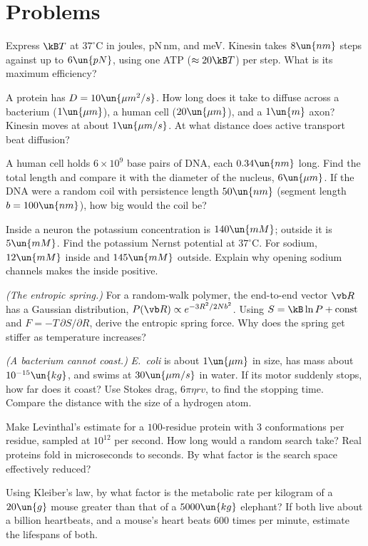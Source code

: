 \section{Problems}

\begin{problems}
\core Express $\kB T$ at $37^\circ\text{C}$ in joules, pN\,nm, and meV. Kinesin takes $8\un{nm}$ steps against up to $6\un{pN}$, using one ATP ($\approx20\kB T$) per step. What is its maximum efficiency?

\core A protein has $D = 10\un{\mu m^2/s}$. How long does it take to diffuse across a bacterium ($1\un{\mu m}$), a human cell ($20\un{\mu m}$), and a $1\un{m}$ axon? Kinesin moves at about $1\un{\mu m/s}$. At what distance does active transport beat diffusion?

 A human cell holds $6\times10^9$ base pairs of DNA, each $0.34\un{nm}$ long. Find the total length and compare it with the diameter of the nucleus, $6\un{\mu m}$. If the DNA were a random coil with persistence length $50\un{nm}$ (segment length $b = 100\un{nm}$), how big would the coil be?

\core Inside a neuron the potassium concentration is $140\un{mM}$; outside it is $5\un{mM}$. Find the potassium Nernst potential at $37^\circ\text{C}$. For sodium, $12\un{mM}$ inside and $145\un{mM}$ outside. Explain why opening sodium channels makes the inside positive.

\core \emph{(The entropic spring.)} For a random-walk polymer, the end-to-end vector $\vb R$ has a Gaussian distribution, $P(\vb R)\propto e^{-3R^2/2Nb^2}$. Using $S = \kB\ln P + \text{const}$ and $F = -T\,\partial S/\partial R$, derive the entropic spring force. Why does the spring get stiffer as temperature increases?

 \emph{(A bacterium cannot coast.)} \emph{E.~coli} is about $1\un{\mu m}$ in size, has mass about $10^{-15}\un{kg}$, and swims at $30\un{\mu m/s}$ in water. If its motor suddenly stops, how far does it coast? Use Stokes drag, $6\pi\eta rv$, to find the stopping time. Compare the distance with the size of a hydrogen atom.

 Make Levinthal's estimate for a $100$-residue protein with $3$ conformations per residue, sampled at $10^{12}$ per second. How long would a random search take? Real proteins fold in microseconds to seconds. By what factor is the search space effectively reduced?

 Using Kleiber's law, by what factor is the metabolic rate per kilogram of a $20\un{g}$ mouse greater than that of a $5000\un{kg}$ elephant? If both live about a billion heartbeats, and a mouse's heart beats $600$ times per minute, estimate the lifespans of both.


\end{problems}
